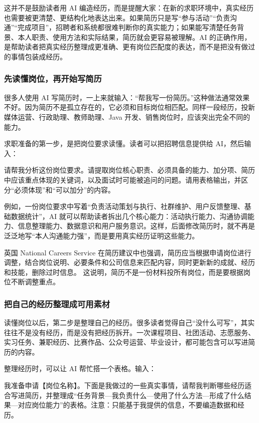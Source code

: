 这并不是鼓励读者用 AI 编造经历，而是提醒大家：在新的求职环境中，真实经历也需要被更清楚、更结构化地表达出来。如果简历只是写“参与活动”“负责沟通”“完成项目”，招聘者和系统都很难判断你的真实能力；如果能写清楚任务背景、本人职责、使用方法和实际结果，简历就会更容易被理解。AI 的正确作用，是帮助读者把真实经历整理成更准确、更有岗位匹配度的表达，而不是把没有做过的事情包装成经历。

\subsubsection*{先读懂岗位，再开始写简历}

很多人使用 AI 写简历时，一上来就输入：“帮我写一份简历。”这种做法通常效果不好。因为简历不是孤立存在的，它必须和目标岗位相匹配。同样一段经历，投新媒体运营、行政助理、教师助理、Java 开发、销售岗位时，应该突出完全不同的能力。

求职准备的第一步，是把岗位要求读懂。读者可以把招聘信息提供给 AI，然后输入：

\begin{tcolorbox}[promptbox]
请帮我分析这份岗位要求。请提取岗位核心职责、必须具备的能力、加分项、简历中应该重点体现的关键词，以及面试时可能被追问的问题。请用表格输出，并区分“必须体现”和“可以加分”的内容。
\end{tcolorbox}

例如，一份岗位要求中写着“负责活动策划与执行、社群维护、用户反馈整理、基础数据统计”，AI 就可以帮助读者拆出几个核心能力：活动执行能力、沟通协调能力、信息整理能力、数据意识和用户服务意识。这样，后面修改简历时，就不再是泛泛地写“本人沟通能力强”，而是要用真实经历证明这些能力。

英国 National Careers Service 在简历建议中也强调，简历应当根据申请岗位进行调整，结合岗位说明、必要条件和公司信息来匹配内容，同时更新新的成就、经历和技能，删除过时信息。 这说明，简历不是一份材料投所有岗位，而是要根据岗位不断调整重点。

\subsubsection*{把自己的经历整理成可用素材}

读懂岗位以后，第二步是整理自己的经历。很多读者觉得自己“没什么可写”，其实往往不是没有经历，而是没有把经历拆开。一次课程项目、社团活动、志愿服务、实习任务、兼职经历、比赛作品、公众号运营、毕业设计，都可能包含可以写进简历的内容。

整理经历时，可以让 AI 帮忙搭一个表格。输入：

\begin{tcolorbox}[promptbox]
我准备申请【岗位名称】。下面是我做过的一些真实事情，请帮我判断哪些经历适合写进简历，并整理成“任务背景—我负责什么—使用了什么方法—形成了什么结果—对应岗位能力”的表格。注意：只能基于我提供的信息，不要编造数据和经历。
\end{tcolorbox}

